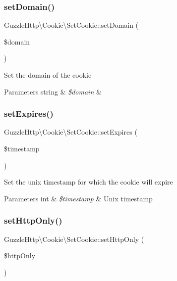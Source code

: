 \subsubsection{\texorpdfstring{set\+Domain()}{setDomain()}}
{\footnotesize\ttfamily Guzzle\+Http\textbackslash{}\+Cookie\textbackslash{}\+Set\+Cookie\+::set\+Domain (\begin{DoxyParamCaption}\item[{}]{\$domain }\end{DoxyParamCaption})}

Set the domain of the cookie


\begin{DoxyParams}[1]{Parameters}
string & {\em \$domain} & \\
\hline
\end{DoxyParams}
\mbox{\label{classGuzzleHttp_1_1Cookie_1_1SetCookie_a501b5a9b3f987136dc86bb54a85924d9}} 
\subsubsection{\texorpdfstring{set\+Expires()}{setExpires()}}
{\footnotesize\ttfamily Guzzle\+Http\textbackslash{}\+Cookie\textbackslash{}\+Set\+Cookie\+::set\+Expires (\begin{DoxyParamCaption}\item[{}]{\$timestamp }\end{DoxyParamCaption})}

Set the unix timestamp for which the cookie will expire


\begin{DoxyParams}[1]{Parameters}
int & {\em \$timestamp} & Unix timestamp \\
\hline
\end{DoxyParams}
\mbox{\label{classGuzzleHttp_1_1Cookie_1_1SetCookie_ade5a595a5e0deeee6bad4897511b1a3d}} 
\subsubsection{\texorpdfstring{set\+Http\+Only()}{setHttpOnly()}}
{\footnotesize\ttfamily Guzzle\+Http\textbackslash{}\+Cookie\textbackslash{}\+Set\+Cookie\+::set\+Http\+Only (\begin{DoxyParamCaption}\item[{}]{\$http\+Only }\end{DoxyParamCaption})}

